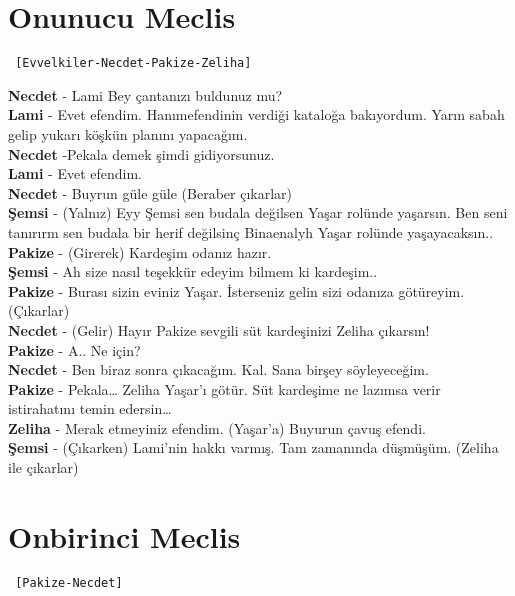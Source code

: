 \documentclass[]{book}
\begin{document}
\hypertarget{onunucu-meclis}{%
\section{Onunucu Meclis}\label{onunucu-meclis}}

\begin{verbatim}
 [Evvelkiler-Necdet-Pakize-Zeliha]
\end{verbatim}

\textbf{Necdet} - Lami Bey çantanızı buldunuz mu?\\
\textbf{Lami} - Evet efendim. Hanımefendinin verdiği kataloğa bakıyordum. Yarın sabah gelip yukarı köşkün planını yapacağım.\\
\textbf{Necdet} -Pekala demek şimdi gidiyorsunuz.\\
\textbf{Lami} - Evet efendim.\\
\textbf{Necdet} - Buyrun güle güle (Beraber çıkarlar)\\
\textbf{Şemsi} - (Yalnız) Eyy Şemsi sen budala değilsen Yaşar rolünde yaşarsın. Ben seni tanırırm sen budala bir herif değilsinç Binaenalyh Yaşar rolünde yaşayacaksın..\\
\textbf{Pakize} - (Girerek) Kardeşim odanız hazır.\\
\textbf{Şemsi} - Ah size nasıl teşekkür edeyim bilmem ki kardeşim..\\
\textbf{Pakize} - Burası sizin eviniz Yaşar. İsterseniz gelin sizi odanıza götüreyim. (Çıkarlar)\\
\textbf{Necdet} - (Gelir) Hayır Pakize sevgili süt kardeşinizi Zeliha çıkarsın!\\
\textbf{Pakize} - A.. Ne için?\\
\textbf{Necdet} - Ben biraz sonra çıkacağım. Kal. Sana birşey söyleyeceğim.\\
\textbf{Pakize} - Pekala\ldots{} Zeliha Yaşar'ı götür. Süt kardeşime ne lazımsa verir istirahatını temin edersin\ldots{}\\
\textbf{Zeliha} - Merak etmeyiniz efendim. (Yaşar'a) Buyurun çavuş efendi.\\
\textbf{Şemsi} - (Çıkarken) Lami'nin hakkı varmış. Tam zamanında düşmüşüm. (Zeliha ile çıkarlar)\\

\hypertarget{onbirinci-meclis}{%
\section{Onbirinci Meclis}\label{onbirinci-meclis}}

\begin{verbatim}
 [Pakize-Necdet]
\end{verbatim}
\end{document}
